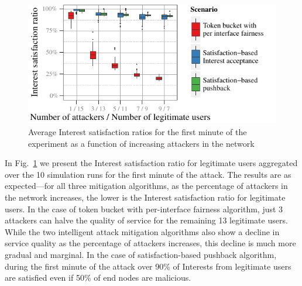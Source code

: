 \documentclass[10pt,conference]{IEEEtran}
\renewcommand{\texttt}[1]{{\nicettfont #1}}
\begin{document}
{%

\begin{figure}[t]
  \centering
  \includegraphics[scale=0.8]{paper-topo-tree/tree-good-0-producer-gw-avg-1-min}
  \caption{Average Interest satisfaction ratios for the first minute of the experiment as a function of increasing attackers in the network}
  \label{fig:small-scale-topo boxplot}
\end{figure}

In Fig.~\ref{fig:small-scale-topo boxplot} we present  the Interest satisfaction ratio for legitimate users aggregated over the 10 simulation runs for the first minute of the attack. The results are as expected---for all three mitigation algorithms, as the percentage of attackers in the network increases, the lower is the Interest satisfaction ratio for legitimate users.
In the case of token bucket with per-interface fairness algorithm, just 3 attackers can halve the quality of service for the remaining 13 legitimate users. While the two intelligent attack mitigation algorithms also show a decline in service quality as the percentage of attackers increases, this decline is much more gradual and marginal. In the case of satisfaction-based pushback algorithm, during the first minute of the attack over 90\% of Interests from legitimate users are satisfied even if 50\% of end nodes are malicious.  
 



}
\end{document}
